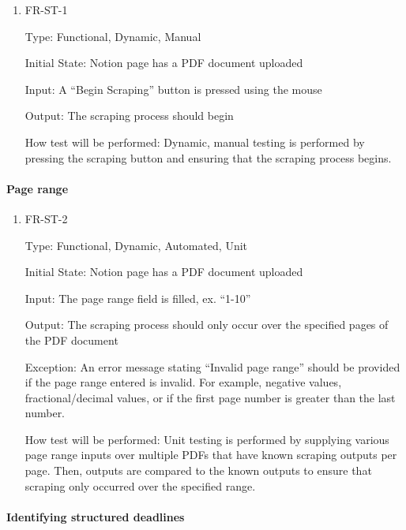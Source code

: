 \documentclass[12pt, titlepage]{article}
\begin{document}
\begin{enumerate}

\item{FR-ST-1\\}

Type: Functional, Dynamic, Manual 

Initial State: Notion page has a PDF document uploaded 

Input: A “Begin Scraping” button is pressed using the mouse 

Output: The scraping process should begin 

How test will be performed: Dynamic, manual testing is performed by pressing the scraping button and ensuring that the scraping process begins. 

\end{enumerate}

\paragraph{Page range}

\begin{enumerate}

\item{FR-ST-2\\}

Type: Functional, Dynamic, Automated, Unit 

Initial State: Notion page has a PDF document uploaded 

Input: The page range field is filled, ex. “1-10” 

Output: The scraping process should only occur over the specified pages of the PDF document 

Exception: An error message stating “Invalid page range” should be provided if the page range entered is invalid. For example, negative values, fractional/decimal values, or if the first page number is greater than the last number. 

How test will be performed: Unit testing is performed by supplying various page range inputs over multiple PDFs that have known scraping outputs per page. Then, outputs are compared to the known outputs to ensure that scraping only occurred over the specified range. 

\end{enumerate}

\paragraph{Identifying structured deadlines}
\end{document}
